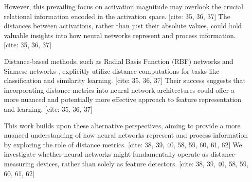 However, this prevailing focus on activation magnitude may overlook the crucial relational information encoded in the activation space. [cite: 35, 36, 37] The distances between activations, rather than just their absolute values, could hold valuable insights into how neural networks represent and process information. [cite: 35, 36, 37]

Distance-based methods, such as Radial Basis Function (RBF) networks \cite{broomhead1988radial} and Siamese networks \cite{bromley1994signature,schroff2015facenet}, explicitly utilize distance computations for tasks like classification and similarity learning. [cite: 35, 36, 37] Their success suggests that incorporating distance metrics into neural network architectures could offer a more nuanced and potentially more effective approach to feature representation and learning. [cite: 35, 36, 37]

This work builds upon these alternative perspectives, aiming to provide a more nuanced understanding of how neural networks represent and process information by exploring the role of distance metrics. [cite: 38, 39, 40, 58, 59, 60, 61, 62] We investigate whether neural networks might fundamentally operate as distance-measuring devices, rather than solely as feature detectors. [cite: 38, 39, 40, 58, 59, 60, 61, 62]